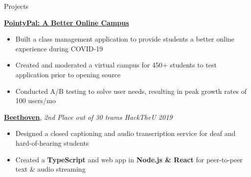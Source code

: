 \documentclass{resume}
\begin{document}
%
%
%
\begin{rSection}{Projects}

    \href{https://github.com/UtahTriangle/pointypal}{\bf PointyPal: A Better Online Campus}
    \vspace{-6pt}
    \begin{itemize}[nosep]
        \item Built a class management application to provide students a better online experience during COVID-19
        \item Created and moderated a virtual campus for 450+ students to test application prior to opening source 
        \item Conducted A/B testing to solve user needs, resulting in peak growth rates of 100 users/mo
    \end{itemize}

    
    \href{https://devpost.com/software/beethoven-t9ud86}{\bf Beethoven}, {\em 2nd Place out of 30 teams
    \hfill HackTheU 2019}
    \vspace{-6pt}
    \begin{itemize}[nosep]
        \item Designed a closed captioning and audio transcription service for deaf and hard-of-hearing students
        \item Created a {\bf TypeScript} and  web app in {\bf Node.js \& React} for peer-to-peer text \& audio streaming
    \end{itemize}
    

\end{rSection}
\end{document}
